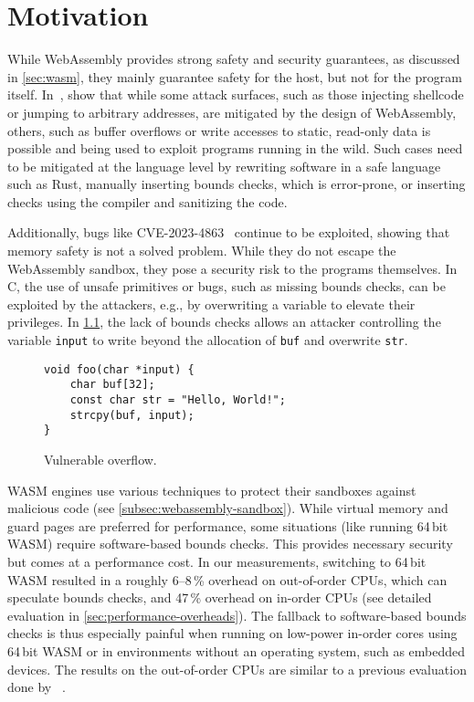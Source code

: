 \chapter{Motivation}
\label{ch:motivation}

While WebAssembly provides strong safety and security guarantees, as discussed in \cref{sec:wasm}, they mainly guarantee safety for the host, but not for the program itself.
In~\cite{lehmann2020everything}, \citeauthor*{lehmann2020everything} show that while some attack surfaces, such as those injecting shellcode or jumping to arbitrary addresses, are mitigated by the design of WebAssembly, others, such as buffer overflows or write accesses to static, read-only data is possible and being used to exploit programs running in the wild.
Such cases need to be mitigated at the language level by rewriting software in a safe language such as Rust, manually inserting bounds checks, which is error-prone, or inserting checks using the compiler and sanitizing the code.

Additionally, bugs like {CVE-2023-4863}~\cite{CVE-2023-4863} continue to be exploited, showing that memory safety is not a solved problem.
While they do not escape the WebAssembly sandbox, they pose a security risk to the programs themselves.
In C, the use of unsafe primitives or bugs, such as missing bounds checks, can be exploited by the attackers, e.g., by overwriting a variable to elevate their privileges.
In \cref{fig:vulnerable-overflow}, the lack of bounds checks allows an attacker controlling the variable \texttt{input} to write beyond the allocation of \texttt{buf} and overwrite \texttt{str}.

\begin{figure}[h]
    \centering
    \begin{lstlisting}[frame=h,style=customc,label={lst:vulnerable-overflow}]
void foo(char *input) {
    char buf[32];
    const char str = "Hello, World!";
    strcpy(buf, input);
}
    \end{lstlisting}
    \caption{Vulnerable overflow.}
    \label{fig:vulnerable-overflow}
\end{figure}

\Ac{WASM} engines use various techniques to protect their sandboxes against malicious code (see \cref{subsec:webassembly-sandbox}).
While virtual memory and guard pages are preferred for performance, some situations (like running 64\,bit \ac{WASM}) require software-based bounds checks.
This provides necessary security but comes at a performance cost.
In our measurements, switching to 64\,bit \ac{WASM} resulted in a roughly 6--8\,\% overhead on out-of-order CPUs, which can speculate bounds checks, and 47\,\% overhead on in-order CPUs (see detailed evaluation in \cref{sec:performance-overheads}).
The fallback to software-based bounds checks is thus especially painful when running on low-power in-order cores using 64\,bit \ac{WASM} or in environments without an operating system, such as embedded devices.
The results on the out-of-order CPUs are similar to a previous evaluation done by \citeauthor*{szewczyk2022leaps}~\cite{szewczyk2022leaps}.

